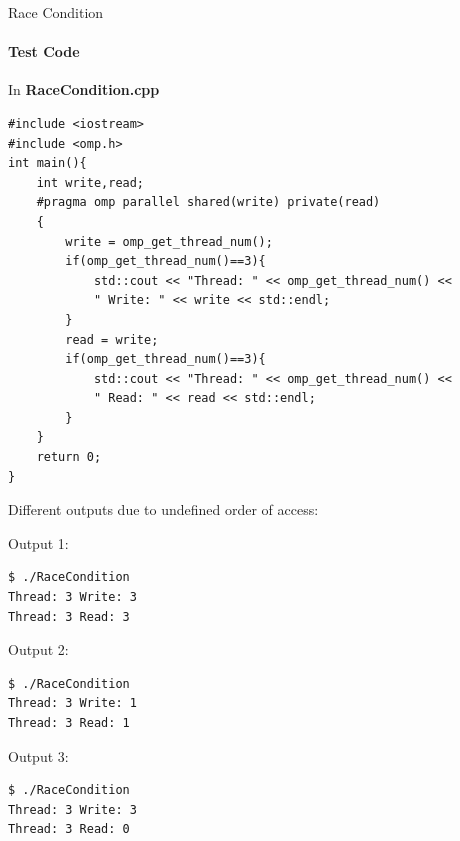 \documentclass[9pt,pdftex]{beamer}
\begin{document}
\begin{frame}[fragile]{Race Condition}
\framesubtitle{Test Code}
In \textbf{RaceCondition.cpp}
\scriptsize{
\begin{lstlisting} 
#include <iostream>
#include <omp.h>
int main(){
    int write,read;
    #pragma omp parallel shared(write) private(read)
    {
        write = omp_get_thread_num();
        if(omp_get_thread_num()==3){
            std::cout << "Thread: " << omp_get_thread_num() << 
            " Write: " << write << std::endl;
        }
        read = write;
        if(omp_get_thread_num()==3){
            std::cout << "Thread: " << omp_get_thread_num() << 
            " Read: " << read << std::endl;
        }
    }
    return 0;
}
\end{lstlisting}
}
Different outputs due to undefined order of access:\\
\begin{minipage}[t]{0.33\textwidth}
Output 1:
\scriptsize{
\begin{lstlisting}
$ ./RaceCondition 
Thread: 3 Write: 3
Thread: 3 Read: 3
\end{lstlisting}
}
\end{minipage}
\begin{minipage}[t]{0.33\textwidth}
Output 2:
\scriptsize{
\begin{lstlisting}
$ ./RaceCondition 
Thread: 3 Write: 1
Thread: 3 Read: 1
\end{lstlisting}
}
\end{minipage}
\begin{minipage}[t]{0.33\textwidth}
Output 3:
\scriptsize{
\begin{lstlisting}
$ ./RaceCondition 
Thread: 3 Write: 3
Thread: 3 Read: 0
\end{lstlisting}
}
\end{minipage}
\end{frame}
\end{document}
